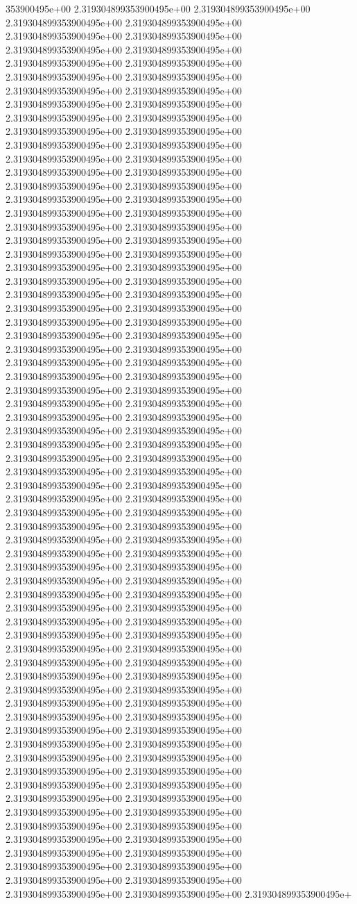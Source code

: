 353900495e+00	2.319304899353900495e+00	2.319304899353900495e+00	2.319304899353900495e+00	2.319304899353900495e+00	2.319304899353900495e+00	2.319304899353900495e+00	2.319304899353900495e+00	2.319304899353900495e+00	2.319304899353900495e+00	2.319304899353900495e+00	2.319304899353900495e+00	2.319304899353900495e+00	2.319304899353900495e+00	2.319304899353900495e+00	2.319304899353900495e+00	2.319304899353900495e+00	2.319304899353900495e+00	2.319304899353900495e+00	2.319304899353900495e+00	2.319304899353900495e+00	2.319304899353900495e+00	2.319304899353900495e+00	2.319304899353900495e+00	2.319304899353900495e+00	2.319304899353900495e+00	2.319304899353900495e+00	2.319304899353900495e+00	2.319304899353900495e+00	2.319304899353900495e+00	2.319304899353900495e+00	2.319304899353900495e+00	2.319304899353900495e+00	2.319304899353900495e+00	2.319304899353900495e+00	2.319304899353900495e+00	2.319304899353900495e+00	2.319304899353900495e+00	2.319304899353900495e+00	2.319304899353900495e+00	2.319304899353900495e+00	2.319304899353900495e+00	2.319304899353900495e+00	2.319304899353900495e+00	2.319304899353900495e+00	2.319304899353900495e+00	2.319304899353900495e+00	2.319304899353900495e+00	2.319304899353900495e+00	2.319304899353900495e+00	2.319304899353900495e+00	2.319304899353900495e+00	2.319304899353900495e+00	2.319304899353900495e+00	2.319304899353900495e+00	2.319304899353900495e+00	2.319304899353900495e+00	2.319304899353900495e+00	2.319304899353900495e+00	2.319304899353900495e+00	2.319304899353900495e+00	2.319304899353900495e+00	2.319304899353900495e+00	2.319304899353900495e+00	2.319304899353900495e+00	2.319304899353900495e+00	2.319304899353900495e+00	2.319304899353900495e+00	2.319304899353900495e+00	2.319304899353900495e+00	2.319304899353900495e+00	2.319304899353900495e+00	2.319304899353900495e+00	2.319304899353900495e+00	2.319304899353900495e+00	2.319304899353900495e+00	2.319304899353900495e+00	2.319304899353900495e+00	2.319304899353900495e+00	2.319304899353900495e+00	2.319304899353900495e+00	2.319304899353900495e+00	2.319304899353900495e+00	2.319304899353900495e+00	2.319304899353900495e+00	2.319304899353900495e+00	2.319304899353900495e+00	2.319304899353900495e+00	2.319304899353900495e+00	2.319304899353900495e+00	2.319304899353900495e+00	2.319304899353900495e+00	2.319304899353900495e+00	2.319304899353900495e+00	2.319304899353900495e+00	2.319304899353900495e+00	2.319304899353900495e+00	2.319304899353900495e+00	2.319304899353900495e+00	2.319304899353900495e+00	2.319304899353900495e+00	2.319304899353900495e+00	2.319304899353900495e+00	2.319304899353900495e+00	2.319304899353900495e+00	2.319304899353900495e+00	2.319304899353900495e+00	2.319304899353900495e+00	2.319304899353900495e+00	2.319304899353900495e+00	2.319304899353900495e+00	2.319304899353900495e+00	2.319304899353900495e+00	2.319304899353900495e+00	2.319304899353900495e+00	2.319304899353900495e+00	2.319304899353900495e+00	2.319304899353900495e+00	2.319304899353900495e+00	2.319304899353900495e+00	2.319304899353900495e+00	2.319304899353900495e+00	2.319304899353900495e+00	2.319304899353900495e+00	2.319304899353900495e+00	2.319304899353900495e+00	2.319304899353900495e+00	2.319304899353900495e+00	2.319304899353900495e+00	2.319304899353900495e+00	2.319304899353900495e+00	2.319304899353900495e+00	2.319304899353900495e+00	2.319304899353900495e+